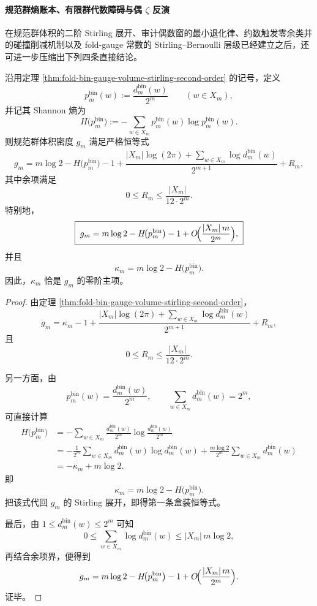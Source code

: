 \paragraph{规范群熵账本、有限群代数障碍与偶 \texorpdfstring{$\zeta$}{zeta} 反演}
在规范群体积的二阶 Stirling 展开、审计偶数窗的最小退化律、约数触发零余类并的碰撞削减机制以及 fold-gauge 常数的 Stirling--Bernoulli 层级已经建立之后，还可进一步压缩出下列四条直接结论。

\begin{theorem}[规范群熵的精确账本恒等式]\label{thm:xi-time-part60aa-gauge-entropy-ledger-exact-identity}
沿用定理 \ref{thm:fold-bin-gauge-volume-stirling-second-order} 的记号，定义
\[
p_m^{\mathrm{bin}}(w):=\frac{d_m^{\mathrm{bin}}(w)}{2^m}
\qquad (w\in X_m),
\]
并记其 Shannon 熵为
\[
H\!\bigl(p_m^{\mathrm{bin}}\bigr):=
-\sum_{w\in X_m}p_m^{\mathrm{bin}}(w)\log p_m^{\mathrm{bin}}(w).
\]
则规范群体积密度 \(g_m\) 满足严格恒等式
\[
\boxed{\;
g_m
=
m\log 2
-H\!\bigl(p_m^{\mathrm{bin}}\bigr)
-1
+\frac{|X_m|\log(2\pi)+\sum_{w\in X_m}\log d_m^{\mathrm{bin}}(w)}{2^{m+1}}
+R_m,\;}
\]
其中余项满足
\[
\boxed{\;
0\le R_m\le \frac{|X_m|}{12\cdot 2^m}.\;}
\]
特别地，
\[
\boxed{\;
g_m
=
m\log 2
-H\!\bigl(p_m^{\mathrm{bin}}\bigr)
-1
+O\!\Bigl(\frac{|X_m|\,m}{2^m}\Bigr),\;}
\]
并且
\[
\boxed{\;
\kappa_m=m\log 2-H\!\bigl(p_m^{\mathrm{bin}}\bigr).\;}
\]
因此，\(\kappa_m\) 恰是 \(g_m\) 的零阶主项。
\end{theorem}
\begin{proof}
由定理 \ref{thm:fold-bin-gauge-volume-stirling-second-order}，
\[
g_m
=
\kappa_m-1+\frac{|X_m|\log(2\pi)+\sum_{w\in X_m}\log d_m^{\mathrm{bin}}(w)}{2^{m+1}}
+R_m,
\]
且
\[
0\le R_m\le \frac{|X_m|}{12\cdot 2^m}.
\]

另一方面，由
\[
p_m^{\mathrm{bin}}(w)=\frac{d_m^{\mathrm{bin}}(w)}{2^m},
\qquad
\sum_{w\in X_m}d_m^{\mathrm{bin}}(w)=2^m,
\]
可直接计算
\[
\begin{aligned}
H\!\bigl(p_m^{\mathrm{bin}}\bigr)
&=
-\sum_{w\in X_m}\frac{d_m^{\mathrm{bin}}(w)}{2^m}
\log\frac{d_m^{\mathrm{bin}}(w)}{2^m}\\
&=
-\frac{1}{2^m}\sum_{w\in X_m}d_m^{\mathrm{bin}}(w)\log d_m^{\mathrm{bin}}(w)
+\frac{m\log 2}{2^m}\sum_{w\in X_m}d_m^{\mathrm{bin}}(w)\\
&=
-\kappa_m+m\log 2.
\end{aligned}
\]
即
\[
\kappa_m=m\log 2-H\!\bigl(p_m^{\mathrm{bin}}\bigr).
\]
把该式代回 \(g_m\) 的 Stirling 展开，即得第一条盒装恒等式。

最后，由 \(1\le d_m^{\mathrm{bin}}(w)\le 2^m\) 可知
\[
0\le \sum_{w\in X_m}\log d_m^{\mathrm{bin}}(w)\le |X_m|\,m\log 2,
\]
再结合余项界，便得到
\[
g_m
=
m\log 2-H\!\bigl(p_m^{\mathrm{bin}}\bigr)-1
+O\!\Bigl(\frac{|X_m|\,m}{2^m}\Bigr).
\]
证毕。
\end{proof}

